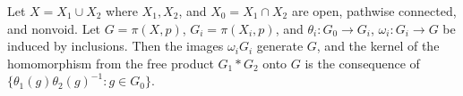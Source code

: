 Let $X = X_1 \cup X_2$ where $X_1, X_2$, and $X_0 = X_1 \cap X_2$ are open, pathwise connected, and nonvoid. Let $G = \pi(X,p)$, $G_i = \pi(X_i,p)$, and $\theta_i: G_0 \to G_i$, $\omega_i: G_i \to G$ be induced by inclusions. Then the images $\omega_i G_i$ generate $G$, and the kernel of the homomorphism from the free product $G_1 * G_2$ onto $G$ is the consequence of $\{\theta_1(g) \theta_2(g)^{-1} : g \in G_0\}$.
